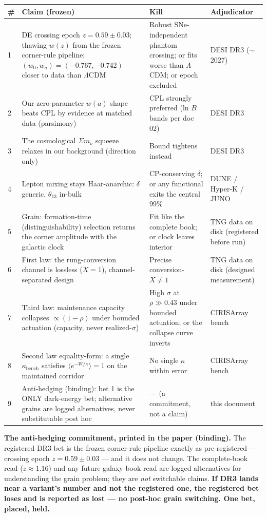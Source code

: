 \documentclass[11pt,a4paper]{article}
\begin{document}
\begin{center}
\small
\renewcommand{\arraystretch}{1.25}
\begin{tabular}{@{}p{0.4cm}p{6.2cm}p{4.0cm}p{2.6cm}@{}}
\toprule
\# & \textbf{Claim (frozen)} & \textbf{Kill} & \textbf{Adjudicator} \\
\midrule
1 & DE crossing epoch $z = 0.59 \pm 0.03$; thawing $w(z)$ from the frozen corner-rule pipeline; $(w_0, w_a) = (-0.767, -0.742)$ closer to data than $\Lambda$CDM & Robust SNe-independent phantom crossing; or fits worse than $\Lambda$CDM; or epoch excluded & DESI DR3 ($\sim$2027) \\
2 & Our zero-parameter $w(a)$ shape beats CPL by evidence at matched data (parsimony) & CPL strongly preferred (ln $B$ bands per doc 02) & DESI DR3 \\
3 & The cosmological $\Sigma m_\nu$ squeeze relaxes in our background (direction only) & Bound tightens instead & DESI DR3 \\
4 & Lepton mixing stays Haar-anarchic: $\delta$ generic, $\theta_{13}$ in-bulk & CP-conserving $\delta$; or any functional exits the central 99\% & DUNE / Hyper-K / JUNO \\
5 & Grain: formation-time (distinguishability) selection returns the corner amplitude with the galactic clock & Fit like the complete book; or clock leaves interior & TNG data on disk (registered before run) \\
6 & First law: the rung-conversion channel is lossless ($X = 1$), channel-separated design & Precise conversion-$X \ne 1$ & TNG data on disk (designed measurement) \\
7 & Third law: maintenance capacity collapses $\propto (1-\rho)$ under bounded actuation (capacity, never realized-$\sigma$) & High $\sigma$ at $\rho \gg 0.43$ under bounded actuation; or the collapse curve inverts & CIRISArray bench \\
8 & Second law equality-form: a single $\kappa_{\text{bench}}$ satisfies $\langle e^{-W/\kappa}\rangle = 1$ on the maintained corridor & No single $\kappa$ within error & CIRISArray bench \\
9 & Anti-hedging (binding): bet 1 is the ONLY dark-energy bet; alternative grains are logged alternatives, never substitutable post hoc & --- (a commitment, not a claim) & this document \\
\bottomrule
\end{tabular}
\end{center}

\textbf{The anti-hedging commitment, printed in the paper (binding).} The registered DR3 bet is the frozen corner-rule pipeline exactly as pre-registered --- crossing epoch $z = 0.59 \pm 0.03$ --- and it does not change. The complete-book read ($z \approx 1.16$) and any future galaxy-book read are logged alternatives for understanding the grain problem; they are \emph{not} switchable claims. \textbf{If DR3 lands near a variant's number and not the registered one, the registered bet loses and is reported as lost --- no post-hoc grain switching. One bet, placed, held.}
\end{document}
